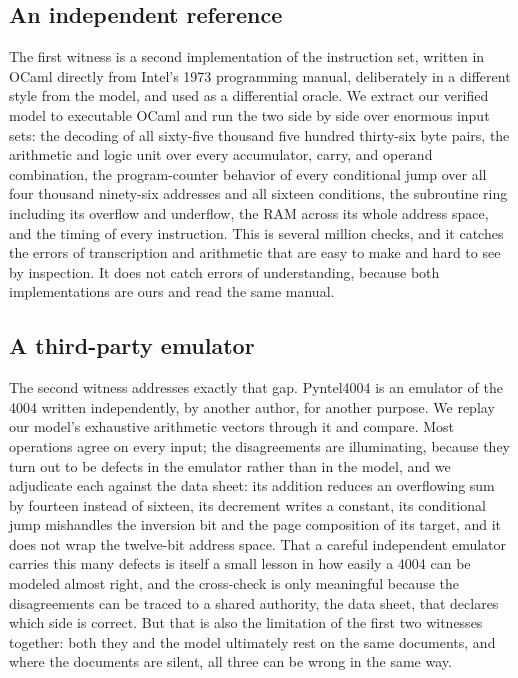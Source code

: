 \documentclass[11pt]{amsart}
\theoremstyle{plain}
\theoremstyle{definition}
\begin{document}
\subsection{An independent reference}

The first witness is a second implementation of the instruction set, written in OCaml directly from Intel's 1973 programming manual, deliberately in a different style from the model, and used as a differential oracle. We extract our verified model to executable OCaml and run the two side by side over enormous input sets: the decoding of all sixty-five thousand five hundred thirty-six byte pairs, the arithmetic and logic unit over every accumulator, carry, and operand combination, the program-counter behavior of every conditional jump over all four thousand ninety-six addresses and all sixteen conditions, the subroutine ring including its overflow and underflow, the RAM across its whole address space, and the timing of every instruction. This is several million checks, and it catches the errors of transcription and arithmetic that are easy to make and hard to see by inspection. It does not catch errors of understanding, because both implementations are ours and read the same manual.

\subsection{A third-party emulator}

The second witness addresses exactly that gap. Pyntel4004 \cite{pyntel} is an emulator of the 4004 written independently, by another author, for another purpose. We replay our model's exhaustive arithmetic vectors through it and compare. Most operations agree on every input; the disagreements are illuminating, because they turn out to be defects in the emulator rather than in the model, and we adjudicate each against the data sheet: its addition reduces an overflowing sum by fourteen instead of sixteen, its decrement writes a constant, its conditional jump mishandles the inversion bit and the page composition of its target, and it does not wrap the twelve-bit address space. That a careful independent emulator carries this many defects is itself a small lesson in how easily a 4004 can be modeled almost right, and the cross-check is only meaningful because the disagreements can be traced to a shared authority, the data sheet, that declares which side is correct. But that is also the limitation of the first two witnesses together: both they and the model ultimately rest on the same documents, and where the documents are silent, all three can be wrong in the same way.
\end{document}
